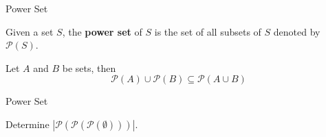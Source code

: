 \documentclass{beamer}
\begin{document}
\begin{frame}[t]{Power Set}
    \begin{definition}
        Given a set $S$, the \textbf{power set} of $S$ is the set of all subsets of $S$ denoted by $\mathcal{P}(S)$.
    \end{definition}
    \begin{theorem}
        Let $A$ and $B$ be sets, then $$\mathcal{P}(A) \cup \mathcal{P}(B) \subseteq \mathcal{P}(A \cup B)$$
    \end{theorem}
\end{frame}

\begin{frame}{}
\end{frame}

\begin{frame}[t]{Power Set}
    \begin{example}
        Determine $|\mathcal{P}(\mathcal{P}(\mathcal{P}(\emptyset)))|$.
    \end{example}
\end{frame}
\end{document}
